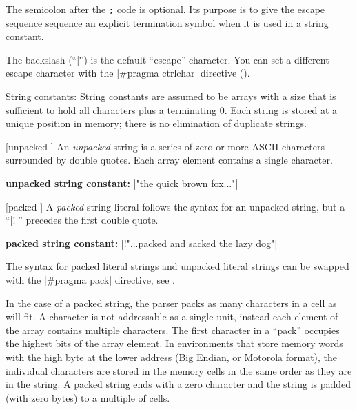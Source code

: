         The semicolon after the {\tt {};} code is optional. Its
        purpose is to give the escape sequence sequence an explicit termination
        symbol when it is used in a string constant.

        The backslash (``|\|'') is the default ``escape'' character. You can set
        a different escape character with the |#pragma ctrlchar| directive
        ().

    \item String constants: 
        String constants are assumed to be arrays with a size that is sufficient
        to hold all characters plus a terminating 0. Each string is stored at a
        unique position in memory; there is no elimination of duplicate strings.

         [unpacked \midtilde]
        An {\it unpacked\/} string is a series of zero or more ASCII characters
        surrounded by double quotes. Each array element contains a single
        character.

        {\bf unpacked string constant:} \lbreak
        \tabto 20pt |"the quick brown fox..."|

         [packed \midtilde]
        A {\it packed\/} string literal follows the syntax for an unpacked
        string, but a ``|!|'' precedes the first double quote.

        {\bf packed string constant:} \lbreak
        \tabto 20pt |!"...packed and sacked the lazy dog"|

        The syntax for packed literal strings and unpacked literal strings can
        be swapped with the |#pragma pack| directive, see .

        In the case of a packed string, the parser packs as many characters
        in a cell as will fit. A character is not addressable as a single
        unit, instead each element of the array contains multiple characters.
        The first character in a ``pack'' occupies the highest bits of the
        array element. In environments that store memory words with the high
        byte at the lower address (Big Endian, or Motorola format), the
        individual characters are stored in the memory cells in the same order
        as they are in the string. A packed string ends with a zero character
        and the string is padded (with zero bytes) to a multiple of cells.

